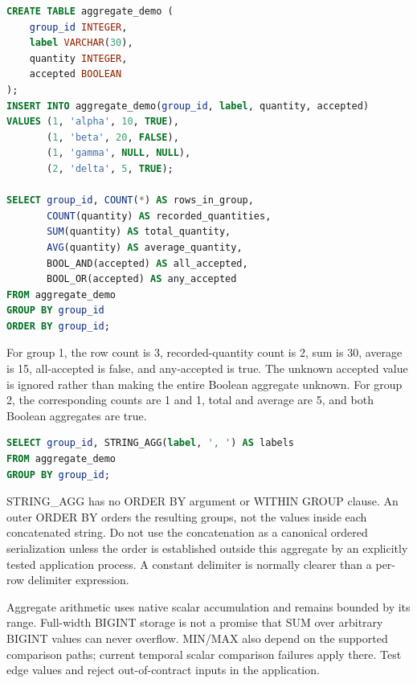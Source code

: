 \begin{lstlisting}[language=SQL]
CREATE TABLE aggregate_demo (
    group_id INTEGER,
    label VARCHAR(30),
    quantity INTEGER,
    accepted BOOLEAN
);
INSERT INTO aggregate_demo(group_id, label, quantity, accepted)
VALUES (1, 'alpha', 10, TRUE),
       (1, 'beta', 20, FALSE),
       (1, 'gamma', NULL, NULL),
       (2, 'delta', 5, TRUE);

SELECT group_id, COUNT(*) AS rows_in_group,
       COUNT(quantity) AS recorded_quantities,
       SUM(quantity) AS total_quantity,
       AVG(quantity) AS average_quantity,
       BOOL_AND(accepted) AS all_accepted,
       BOOL_OR(accepted) AS any_accepted
FROM aggregate_demo
GROUP BY group_id
ORDER BY group_id;
\end{lstlisting}

For group 1, the row count is 3, recorded-quantity count is 2, sum is 30, average is 15, all-accepted is false, and any-accepted is true. The unknown accepted value is ignored rather than making the entire Boolean aggregate unknown. For group 2, the corresponding counts are 1 and 1, total and average are 5, and both Boolean aggregates are true.

\begin{lstlisting}[language=SQL]
SELECT group_id, STRING_AGG(label, ', ') AS labels
FROM aggregate_demo
GROUP BY group_id;
\end{lstlisting}

STRING\_AGG has no ORDER BY argument or WITHIN GROUP clause. An outer ORDER BY orders the resulting groups, not the values inside each concatenated string. Do not use the concatenation as a canonical ordered serialization unless the order is established outside this aggregate by an explicitly tested application process. A constant delimiter is normally clearer than a per-row delimiter expression.

Aggregate arithmetic uses native scalar accumulation and remains bounded by its range. Full-width BIGINT storage is not a promise that SUM over arbitrary BIGINT values can never overflow. MIN/MAX also depend on the supported comparison paths; current temporal scalar comparison failures apply there. Test edge values and reject out-of-contract inputs in the application.


